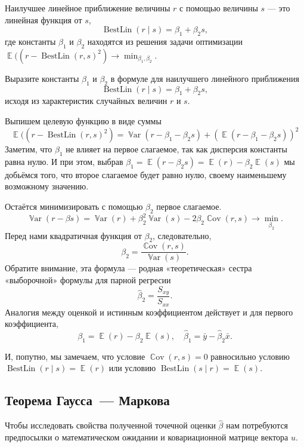 \documentclass[12pt]{article}
\DeclareMathOperator{\Cov}{\mathbb{C}ov}
\DeclareMathOperator{\Var}{\mathbb{V}ar}
\DeclareMathOperator{\BestLin}{BestLin}
\DeclareMathOperator{\E}{\mathbb{E}}
\renewcommand{\b}{\beta}
\newcommand{\hb}{\hat{\beta}}
\renewcommand{\u}{u}
\newenvironment{sol}{}{}
\begin{document}
    

\begin{definition}
Наилучшее линейное приближение величины $r$ с помощью величины $s$ — это линейная функция от $s$,
\[
\BestLin(r \mid s) = \beta_1 + \beta_2 s,
\]
где константы $\beta_1$ и $\beta_2$ находятся из решения задачи оптимизации
$\E((r - \BestLin(r, s)^2) \to \min_{\beta_1, \beta_2}$.
\end{definition}

\begin{problem}
Выразите константы $\b_1$ и $\b_2$ в формуле для наилучшего линейного приближения 
\[
\BestLin(r \mid s) = \b_1 + \b_2 s,
\]
исходя из характеристик случайных величин $r$ и $s$. 

\begin{sol}
Выпишем целевую функцию в виде суммы
\[
    \E((r - \BestLin(r, s)^2)  = \Var(r - \b_1- \beta_2 s) + (\E(r - \b_1 - \b_2 s))^2
\]
Заметим, что $\b_1$ не влияет на первое слагаемое, так как дисперсия константы равна нулю.
И при этом, выбрав $\b_1 = \E(r - \b_2 s) = \E(r) - \b_2\E(s)$ мы добьёмся того, что второе слагаемое будет равно нулю, своему наименьшему возможному значению. 

Остаётся минимизировать с помощью $\b_2$ первое слагаемое. 
\[
\Var(r - \beta s) = \Var(r) + \b_2^2 \Var(s) - 2 \b_2 \Cov(r, s) \to \min_{\b_2}.
\]
Перед нами квадратичная функция от $\b_2$, следовательно, 
\[
\b_2 = \frac{\Cov(r, s)}{ \Var(s)}.
\]
Обратите внимание, эта формула — родная «теоретическая» сестра «выборочной» формулы для парной регресии
\[
\hat\beta_2 = \frac{S_{xy}}{S_{xx}}.
\]
Аналогия между оценкой и истинным коэффициентом действует и для первого коэффициента,
\[
\b_1 = \E(r) - \b_2 \E(s), \quad  \hb_1 = \bar y - \hb_2 \bar x.
\]

И, попутно, мы замечаем, что условие $\Cov(r, s) = 0$ равносильно условию  $\BestLin(r \mid s) = \E(r)$ или условию $\BestLin(s \mid r) = \E(s)$.
\end{sol}

\end{problem}



\subsection{Теорема Гаусса~--- Маркова}

Чтобы исследовать свойства полученной точечной оценки $\hb$ нам потребуются предпосылки о математическом ожидании и ковариационной матрице вектора $\u$.
\end{document}
